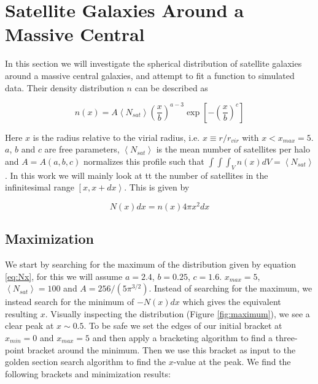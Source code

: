 \section{Satellite Galaxies Around a Massive Central}

In this section we will investigate the spherical distribution of satellite galaxies around a massive central galaxies, and attempt to  fit a function to simulated data. Their density distribution $n$ can be described as

\begin{equation}
    n(x) = A\left<N_{sat}\right>\left(\frac{x}{b}\right)^{a-3}\exp{\left[-\left(\frac{x}{b}\right)^{c}\right]}\label{eq:nx}
\end{equation}

Here $x$ is the radius relative to the virial radius, i.e. $x \equiv r/r_{vir}$ with $x < x_{max} = 5$. $a$, $b$ and $c$ are free parameters, $\left<N_{sat}\right>$ is the mean number of satellites per halo and $A = A(a,b,c)$ normalizes this profile such that $\int\int\int_V n(x)dV = \left<N_{sat}\right>$. In this work we will mainly look at tt the number of satellites in the infinitesimal range $\left[x, x+dx\right>$. This is given by

\begin{equation}
    N(x)dx = n(x)4\pi x^2dx\label{eq:Nx}
\end{equation}



\subsection{Maximization}\label{sec:maxi}

We start by searching for the maximum of the distribution given by equation \ref{eq:Nx}, for this we will assume $a=2.4$, $b=0.25$, $c=1.6$. $x_{max}=5$, $\left<N_{sat}\right>=100$ and $A=256/(5\pi^{3/2})$. Instead of searching for the maximum, we instead search for the minimum of $-N(x)dx$ which gives the equivalent resulting $x$. Visually inspecting the distribution (Figure \ref{fig:maximum}), we see a clear peak at $x \sim 0.5$. To be safe we set the edges of our initial bracket at $x_{min} = 0$ and $x_{max} = 5$ and then apply a bracketing algorithm to find a three-point bracket around the minimum. Then we use this bracket as input to the golden section search algorithm to find the $x$-value at the peak. We find the following brackets and minimization results:  

